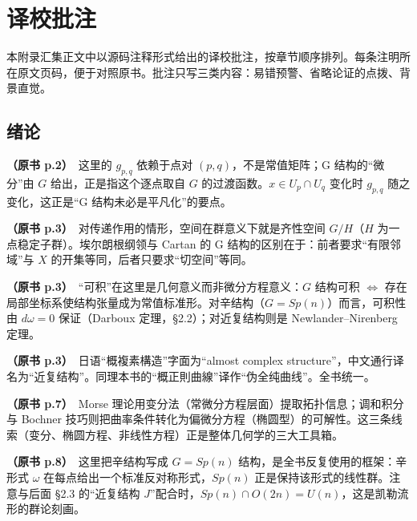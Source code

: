 \chapter{译校批注}

本附录汇集正文中以源码注释形式给出的译校批注，按章节顺序排列。每条注明所在原文页码，便于对照原书。批注只写三类内容：易错预警、省略论证的点拨、背景直觉。\par\medskip

\section*{绪论}

\noindent \textbf{（原书 p.2）}\ 这里的 $g_{p,q}$ 依赖于点对 $(p,q)$，不是常值矩阵；G 结构的“微分”由 $G$ 给出，正是指这个逐点取自 $G$ 的过渡函数。$x\in U_p\cap U_q$ 变化时 $g_{p,q}$ 随之变化，这正是“G 结构未必是平凡化”的要点。\par\smallskip

\noindent \textbf{（原书 p.3）}\ 对传递作用的情形，空间在群意义下就是齐性空间 $G/H$（$H$ 为一点稳定子群）。埃尔朗根纲领与 Cartan 的 G 结构的区别在于：前者要求“有限邻域”与 $X$ 的开集等同，后者只要求“切空间”等同。\par\smallskip

\noindent \textbf{（原书 p.3）}\ “可积”在这里是几何意义而非微分方程意义：$G$ 结构可积 $\Leftrightarrow$ 存在局部坐标系使结构张量成为常值标准形。对辛结构（$G=Sp(n)$）而言，可积性由 $d\omega=0$ 保证（Darboux 定理，§2.2）；对近复结构则是 Newlander–Nirenberg 定理。\par\smallskip

\noindent \textbf{（原书 p.3）}\ 日语“概複素構造”字面为“almost complex structure”，中文通行译名为“近复结构”。同理本书的“概正則曲線”译作“伪全纯曲线”。全书统一。\par\smallskip

\noindent \textbf{（原书 p.7）}\ Morse 理论用变分法（常微分方程层面）提取拓扑信息；调和积分与 Bochner 技巧则把曲率条件转化为偏微分方程（椭圆型）的可解性。这三条线索（变分、椭圆方程、非线性方程）正是整体几何学的三大工具箱。\par\smallskip

\noindent \textbf{（原书 p.8）}\ 这里把辛结构写成 $G=Sp(n)$ 结构，是全书反复使用的框架：辛形式 $\omega$ 在每点给出一个标准反对称形式，$Sp(n)$ 正是保持该形式的线性群。注意与后面 §2.3 的“近复结构 $J$”配合时，$Sp(n)\cap O(2n)=U(n)$，这是凯勒流形的群论刻画。\par\smallskip

